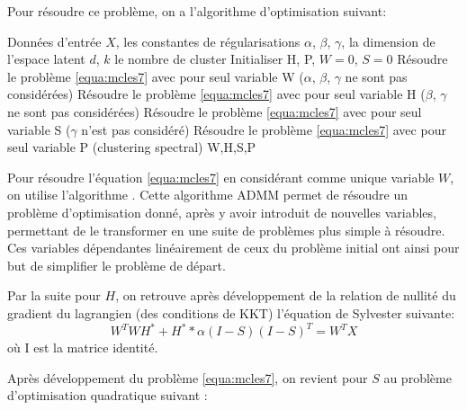   	  Pour résoudre ce problème, on a l'algorithme d'optimisation suivant:
			\begin{algorithm}[H]
				\caption{Algorithme d'optimisation \acrshort{MCLES} \cite{mcles}}
				\label{alg:mcles1}
				\begin{algorithmic}[1]
				\REQUIRE Données d'entrée $X$, les constantes de régularisations $\alpha$, $\beta$, $\gamma$, la dimension de l'espace latent $d$, $k$ le nombre de cluster
				\STATE Initialiser H, P, $W = 0$, $S = 0$
				\REPEAT
					\STATE Résoudre le problème \ref{equa:mcles7} avec pour seul variable W ($\alpha$, $\beta$, $\gamma$ ne sont pas considérées)
					\STATE Résoudre le problème \ref{equa:mcles7} avec pour seul variable H ($\beta$, $\gamma$ ne sont pas considérées)
					\STATE Résoudre le problème \ref{equa:mcles7} avec pour seul variable S ($\gamma$ n'est pas considéré)
					\STATE Résoudre le problème \ref{equa:mcles7} avec pour seul variable P (clustering spectral)
				\RETURN W,H,S,P
				\end{algorithmic}
			\end{algorithm}

    
  	  Pour résoudre l'équation \ref{equa:mcles7} en considérant comme unique variable $W$, on utilise l'algorithme  %
      . Cette algorithme ADMM permet de résoudre un problème d'optimisation donné, après y avoir introduit de nouvelles variables, permettant de le transformer en une suite de problèmes plus simple à résoudre. Ces variables dépendantes linéairement de ceux du problème initial ont ainsi pour but de simplifier le problème de départ.
  	 
  	  Par la suite pour $H$, on retrouve après développement de la relation de nullité du gradient du lagrangien (des conditions de KKT) l'équation de Sylvester suivante:
   	 \begin{equation}
			  W^{T}WH^{*} + H^{*} * \alpha (I - S){( I - S )}^T  = W^{T}X
  	  \end{equation}
   	 où I est la matrice identité.
    
   	 Après développement du problème \ref{equa:mcles7}, on revient pour $S$ au problème d'optimisation quadratique suivant :
  	 
